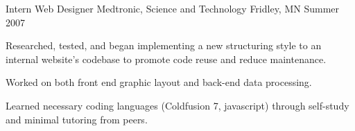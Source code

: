 \cventry
{Intern Web Designer} %
{Medtronic, Science and Technology} %
{Fridley, MN} %
{Summer 2007} %
{
  	\begin{cvitems} %
        \item {Researched, tested, and began implementing a new structuring style to an internal website’s codebase to promote code reuse and reduce maintenance.}
		\item {Worked on both front end graphic layout and back-end data processing.}
		\item {Learned necessary coding languages (Coldfusion 7, javascript) through self-study and minimal tutoring from peers.}
	\end{cvitems}
}